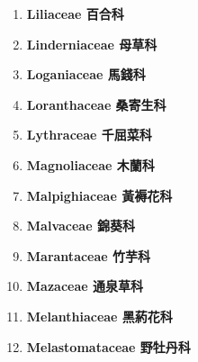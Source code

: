 \begin{enumerate}
        
      \item[] \begin{small}\textbf{Liliaceae 百合科} \end{small}
        
      \item[] \begin{small}\textbf{Linderniaceae 母草科} \end{small}
        
      \item[] \begin{small}\textbf{Loganiaceae 馬錢科} \end{small}
        
      \item[] \begin{small}\textbf{Loranthaceae 桑寄生科} \end{small}
        
      \item[] \begin{small}\textbf{Lythraceae 千屈菜科} \end{small}
        
      \item[] \begin{small}\textbf{Magnoliaceae 木蘭科} \end{small}
        
      \item[] \begin{small}\textbf{Malpighiaceae 黃褥花科} \end{small}
        
      \item[] \begin{small}\textbf{Malvaceae 錦葵科} \end{small}
        
      \item[] \begin{small}\textbf{Marantaceae 竹芋科} \end{small}
        
      \item[] \begin{small}\textbf{Mazaceae 通泉草科} \end{small}
        
      \item[] \begin{small}\textbf{Melanthiaceae 黑葯花科} \end{small}
        
      \item[] \begin{small}\textbf{Melastomataceae 野牡丹科} \end{small}

\end{enumerate}
